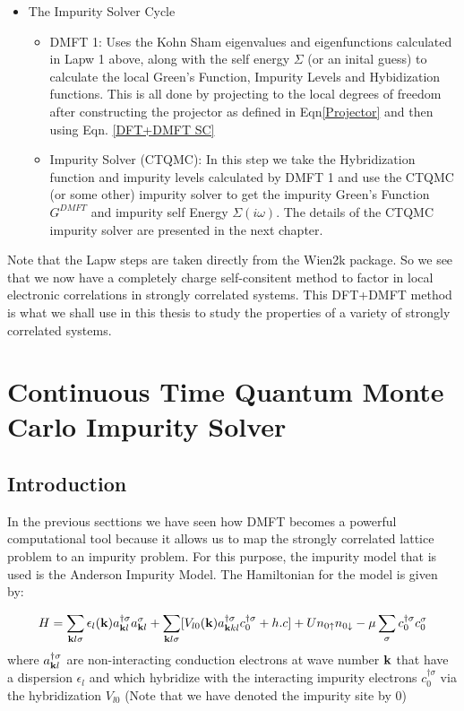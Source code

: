 \documentclass[10pt]{ruthesis}
\begin{document}
\begin{itemize}
\item The Impurity Solver Cycle 
	\begin{itemize}
	\item DMFT 1: Uses the Kohn Sham eigenvalues and eigenfunctions calculated in Lapw 1 above, along with the self energy $\Sigma$ (or an inital guess) to calculate the local Green's Function, Impurity Levels and Hybidization functions. This is all done by projecting to the local degrees of freedom after constructing the projector  	as defined in Eqn\ref{Projector} and then using Eqn. \ref{DFT+DMFT SC} 
	
	\item Impurity Solver (CTQMC): In this step we take the Hybridization function and impurity levels calculated by DMFT 1 and use the CTQMC (or some other) impurity solver to get the impurity Green's Function $G^{DMFT}$ and impurity self Energy $\Sigma(i\omega)$. The details of the CTQMC impurity solver are presented in the next chapter.   
	\end{itemize}	
\end{itemize}

Note that the Lapw steps are taken directly from the Wien2k package. So we see that we now have a completely charge self-consitent method to factor in local electronic correlations in strongly correlated systems. This DFT+DMFT method is what we shall use in this thesis to study the properties of a variety of strongly correlated systems. 
	



\pagebreak
\chapter{Continuous Time Quantum Monte Carlo Impurity Solver}
\section{Introduction}
In the previous secttions we have seen how DMFT becomes a powerful computational tool because it allows us to map the strongly correlated lattice problem to an impurity problem. For this purpose, the impurity model that is used is the Anderson Impurity Model\cite{AIM}. The Hamiltonian for the model is given by:

\begin{equation}
H=\sum_{\mathbf{k}l\sigma} \epsilon_{l}(\mathbf{k})a^{\dagger\sigma}_{\mathbf{k} l}a^{\sigma}_{\mathbf{k} l} +\sum_{\mathbf{k} l\sigma}[V_{l0}( \mathbf{k} )a^{\dagger\sigma}_{\mathbf{k} k l}c^{\dagger\sigma}_{0} +h.c] +Un_{0\uparrow}n_{0\downarrow}-\mu\sum_{\sigma}c^{\dagger \sigma}_{0}c^{\sigma}_{0}
\end{equation}
where $a^{\dagger\sigma}_{\mathbf{k} l}$ are non-interacting conduction electrons at wave number $\mathbf{k}$ that have a dispersion $\epsilon_{l}$ and which hybridize with the interacting impurity electrons $c^{\dagger\sigma}_{0}$ via the hybridization $V_{l0}$ (Note that we have denoted the impurity site by 0)
\end{document}
